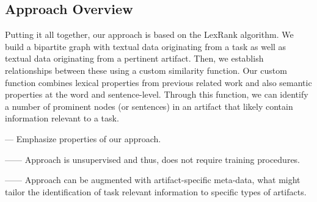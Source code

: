 

\clearpage

\subsection{Approach Overview}


Putting it all together, our approach is based on the LexRank algorithm.
We build a bipartite graph with textual data originating from a task as well as textual data originating from a pertinent artifact.
Then, we establish relationships between these using a custom similarity function.
Our custom function combines lexical properties from previous related work 
and also semantic properties at the word and sentence-level.
Through this function, we can identify a number of prominent nodes (or sentences)
in an artifact that likely contain information relevant to a task.


\vspace{3mm}
--- Emphasize properties of our approach.


------ Approach is unsupervised and thus, does not require training procedures. 



------ Approach can be augmented with artifact-specific meta-data, what might tailor the identification of task relevant information to specific types of artifacts.



